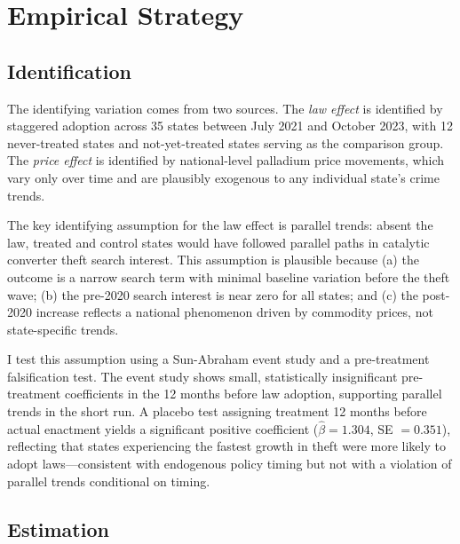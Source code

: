 \documentclass[12pt]{article}
\begin{document}


\section{Empirical Strategy}

\subsection{Identification}

The identifying variation comes from two sources. The \textit{law effect} is identified by staggered adoption across 35 states between July 2021 and October 2023, with 12 never-treated states and not-yet-treated states serving as the comparison group. The \textit{price effect} is identified by national-level palladium price movements, which vary only over time and are plausibly exogenous to any individual state's crime trends.

The key identifying assumption for the law effect is parallel trends: absent the law, treated and control states would have followed parallel paths in catalytic converter theft search interest. This assumption is plausible because (a) the outcome is a narrow search term with minimal baseline variation before the theft wave; (b) the pre-2020 search interest is near zero for all states; and (c) the post-2020 increase reflects a national phenomenon driven by commodity prices, not state-specific trends.

I test this assumption using a Sun-Abraham event study and a pre-treatment falsification test. The event study shows small, statistically insignificant pre-treatment coefficients in the 12 months before law adoption, supporting parallel trends in the short run. A placebo test assigning treatment 12 months before actual enactment yields a significant positive coefficient ($\hat{\beta} = 1.304$, SE $= 0.351$), reflecting that states experiencing the fastest growth in theft were more likely to adopt laws---consistent with endogenous policy timing but not with a violation of parallel trends conditional on timing.

\subsection{Estimation}
\end{document}
